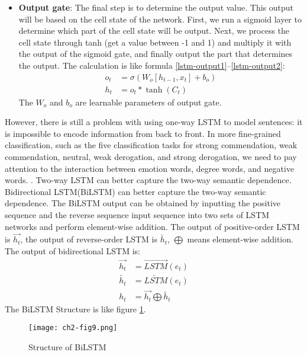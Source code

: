 \begin{itemize}
	\item \textbf{Output gate}: The final step is to determine the output value. This output will be based on the cell state of the network. First, we run a sigmoid layer to determine which part of the cell state will be output. Next, we process the cell state through tanh (get a value between -1 and 1) and multiply it with the output of the sigmoid gate, and finally output the part that determines the output. The calculation is like formula \ref{lstm-output1}--\ref{lstm-output2}:
	      \begin{align}
		      o_{t} & =\sigma\left(W_{o}\left[h_{t-1}, x_{t}\right]+b_{o}\right) \label{lstm-output1} \\
		      h_{t} & =o_{t} * \tanh \left(C_{t}\right) \label{lstm-output2}
	      \end{align}
	      The $W_o$ and $b_o$ are learnable parameters of output gate.
\end{itemize}

However, there is still a problem with using one-way LSTM to model sentences: it is impossible to encode information from back to front. In more fine-grained classification, such as the five classification tasks for strong commendation, weak commendation, neutral, weak derogation, and strong derogation, we need to pay attention to the interaction between emotion words, degree words, and negative words. . Two-way LSTM can better capture the two-way semantic dependence. Bidirectional LSTM(BiLSTM) can better capture the two-way semantic dependence. The BiLSTM output can be obtained by inputting the positive sequence and the reverse sequence input sequence into two sets of LSTM networks and perform element-wise addition. The output of positive-order LSTM is $\overrightarrow{h_t}$, the output of reverse-order LSTM is $\overleftarrow{h_t}$, $\bigoplus$ means element-wise addition. The output of bidirectional LSTM is:
\begin{align}
	\overrightarrow{h_t} & = \overrightarrow{LSTM}(e_t)                       \\
	\overleftarrow{h_t}  & = \overleftarrow{LSTM}(e_t)                        \\
	h_t                  & =\overrightarrow{h_t}\bigoplus \overleftarrow{h_t}
\end{align}
The BiLSTM Structure is like figure \ref{ch2-fig9}.

\begin{figure}[h]
	\centering
	\texttt{[image: ch2-fig9.png]}
	\caption{Structure of BiLSTM}
	\label{ch2-fig9}
\end{figure}

